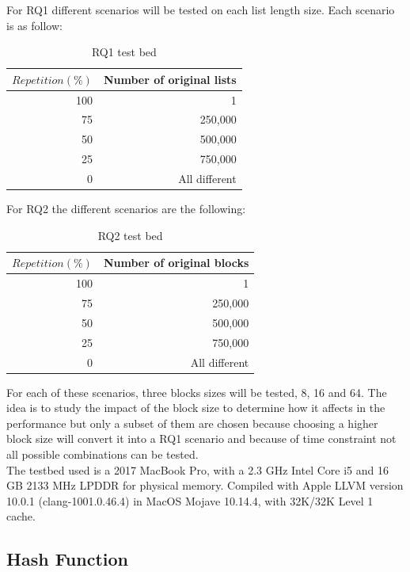 \documentclass[a4paper,12pt]{article}
\begin{document}
For RQ1 different scenarios will be tested on each list length size. Each scenario is as follow:
\\

\begin{table}[H]
\centering
\begin{tabular}{|r|r|}  \hline
	{$Repetition (\%) $} & {Number of original lists}  \\  \hline
	100 & 1 \\
	75 & 250,000\\
	50 & 500,000 \\
	25 & 750,000\\
	0 & All different \\  \hline
\end{tabular}
\caption{RQ1 test bed}
\end{table}

For RQ2 the different scenarios are the following:
\\
\begin{table}[H]
\centering
\begin{tabular}{|r|r|}  \hline
	{$Repetition (\%)$} & {Number of original blocks}  \\  \hline
	100 & 1 \\
	75& 250,000 \\
	50& 500,000 \\
	25& 750,000 \\
	0 &  All different \\  \hline
\end{tabular}
\caption{RQ2 test bed}
\end{table}

For each of these scenarios, three blocks sizes will be tested,  8, 16 and 64. The idea is to study the impact of the block size to determine how it affects in the performance but only a subset of them are chosen because choosing a higher block size will convert it into a RQ1 scenario and because of time constraint not all possible combinations can be tested. \\

The testbed used is a 2017 MacBook Pro, with a 2.3 GHz Intel Core i5 and 16 GB 2133 MHz LPDDR for physical memory. Compiled with Apple LLVM version 10.0.1 (clang-1001.0.46.4) in MacOS Mojave 10.14.4, with 32K/32K Level 1 cache.

\subsection{Hash Function}
\end{document}
